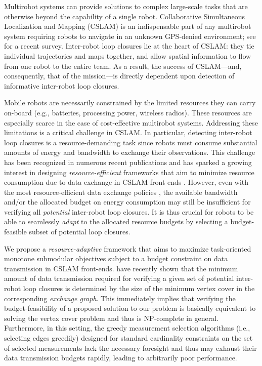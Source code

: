 \documentclass[conference]{IEEEtran}
\begin{document}
Multirobot systems can provide solutions to complex
large-scale tasks that are otherwise beyond the capability of a single robot.
Collaborative Simultaneous Localization and Mapping (CSLAM) is an indispensable
part of any multirobot system requiring robots to navigate in an unknown
\hbox{GPS-denied} environment; see \cite{saeedi2016multiple} for a recent
survey. {Inter-robot} loop closures lie at the heart of CSLAM: they tie
individual trajectories and maps together, and allow spatial information to flow
from one robot to the entire team.  As a result, the success of CSLAM---and,
consequently, that of the mission---is directly dependent upon 
detection of informative inter-robot loop closures.

Mobile robots are necessarily constrained by the limited resources
they can carry on-board (e.g., batteries, processing power, wireless radios). These
resources are especially scarce in the case of cost-effective multirobot
systems. Addressing these limitations is a
critical challenge in CSLAM. In particular, detecting inter-robot loop closures
is a resource-demanding task
\mbox{\cite{Giamou18_ICRA,CieslewskiS17,cieslewski2017efficient,CieslewskiChoudhary17,saeedi2016multiple}}
since robots must consume substantial amounts of energy and bandwidth to
exchange their observations.
This challenge has been recognized in numerous recent publications and has sparked a growing interest
in designing \emph{resource-efficient} 
frameworks that aim to minimize resource consumption due to data exchange in
CSLAM front-ends
\cite{choudhary2017,CieslewskiS17,cieslewski2017efficient,Giamou18_ICRA,leonardos2017distributed}.
However, 
even with the most \hbox{resource-efficient} data exchange policies \cite{CieslewskiS17,cieslewski2017efficient,CieslewskiChoudhary17,Giamou18_ICRA},
the available bandwidth and/or the allocated budget on energy
consumption may still be insufficient for verifying all \emph{potential} inter-robot loop
closures.
It is thus crucial for robots to be able to seamlessly
\emph{adapt} to the allocated resource budgets 
by selecting a budget-feasible subset of potential loop closures.

We propose a \emph{resource-adaptive} framework that aims to maximize
task-oriented monotone
submodular objectives subject to a
budget constraint on data transmission in CSLAM front-ends.
\citet{Giamou18_ICRA} have recently shown that the minimum amount of data transmission required for
verifying a given set of potential inter-robot loop closures is determined by
the size of the minimum 
vertex cover in the corresponding \emph{exchange graph}.
This immediately implies that verifying the budget-feasibility of a proposed solution to our problem
is basically equivalent to solving the vertex cover problem and thus is NP-complete in general. 
Furthermore, in this setting, the greedy measurement selection algorithms (i.e.,
selecting edges greedily)
designed for
standard cardinality constraints on the set of selected measurements
\cite{kasra18ijrr,carlone2017attention,shamaiah2010greedy} 
lack the necessary foresight and thus may exhaust their data transmission budgets
rapidly, leading to arbitrarily poor
performance. 
\end{document}
